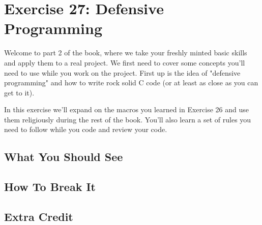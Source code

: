 \chapter{Exercise 27: Defensive Programming}

Welcome to part 2 of the book, where we take your freshly minted basic skills and
apply them to a real project.  We first need to cover some concepts you'll need
to use while you work on the project.  First up is the idea of "defensive programming"
and how to write rock solid C code (or at least as close as you can get to it).

In this exercise we'll expand on the macros you learned in Exercise 26 and 
use them religiously during the rest of the book.  You'll also learn a set of
rules you need to follow while you code and review your code.


\section{What You Should See}


\section{How To Break It}


\section{Extra Credit}



